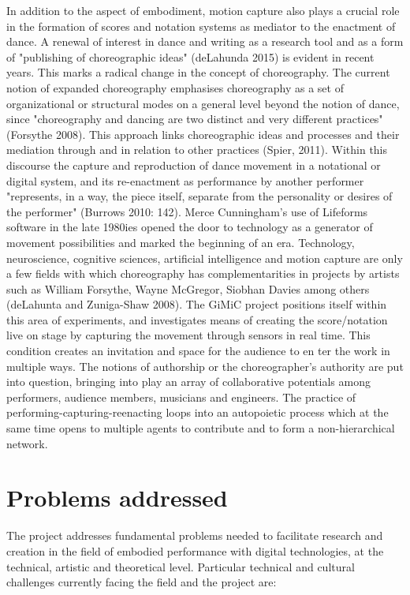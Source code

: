 In addition to the aspect of embodiment, motion capture also plays a crucial role in the formation of scores and notation systems as mediator to the enactment of dance.  A renewal of interest in dance and writing as a research tool and as a form of "publishing of choreographic ideas" (deLahunda 2015) is evident in recent years. This marks a radical change in the concept of choreography. The current notion of expanded choreography emphasises choreography as a set of organizational or structural modes on a general level beyond the notion of dance, since "choreography and dancing are two distinct and very different practices" (Forsythe 2008). This approach links choreographic ideas and processes and their mediation through and in relation to other practices (Spier, 2011).  Within this discourse the capture and reproduction of dance movement in a notational or digital system, and its re-enactment as performance by another performer "represents, in a way, the piece itself, separate from the personality or desires of the performer" (Burrows 2010: 142). Merce Cunningham’s use of Lifeforms software in the late 1980ies opened the door to technology as a generator of movement possibilities and marked the beginning of an era.  Technology, neuroscience, cognitive sciences, artificial intelligence and motion capture are only a few fields with which choreography has complementarities in projects by artists such as William Forsythe, Wayne McGregor, Siobhan Davies among others (deLahunta and Zuniga-Shaw 2008). The GiMiC project positions itself within this area of experiments, and investigates means of creating the score/notation live on stage by capturing the movement through sensors in real time. This condition creates an invitation and space for the audience to en ter the work in multiple ways.  The notions of authorship or the choreographer’s authority are put into question, bringing into play an array of collaborative potentials among performers, audience members, musicians and engineers. The practice of performing-capturing-reenacting loops into an autopoietic process which at the same time opens to multiple agents to contribute and to form a non-hierarchical network.

\section{Problems addressed}
\label{sec:orge4753c8}
The project addresses fundamental problems needed to facilitate research and creation in the field of embodied performance with digital technologies, at the technical, artistic and theoretical level.  Particular technical and cultural challenges currently facing the field and the project are: 

